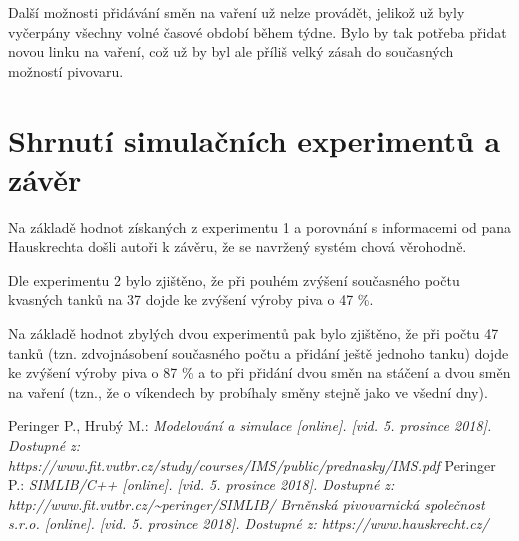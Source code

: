 \documentclass[11pt,a4paper]{article}
\begin{document}
Další možnosti přidávání směn na vaření už nelze provádět, jelikož už byly vyčerpány všechny volné časové období během týdne. Bylo by tak potřeba přidat novou linku na vaření, což už by byl ale příliš velký zásah do současných možností pivovaru.
   
\section{Shrnutí simulačních experimentů a závěr}
Na základě hodnot získaných z experimentu 1 a porovnání s informacemi od pana Hauskrechta došli autoři k závěru, že se navržený systém chová věrohodně.

Dle experimentu 2 bylo zjištěno, že při pouhém zvýšení současného počtu kvasných tanků na 37 dojde ke zvýšení výroby piva o 47 \%.

Na základě hodnot zbylých dvou experimentů pak bylo zjištěno, že při počtu 47 tanků (tzn. zdvojnásobení současného počtu a přidání ještě jednoho tanku) dojde ke zvýšení výroby piva o 87 \% a to při přidání dvou směn na stáčení a dvou směn na vaření (tzn., že o víkendech by probíhaly směny stejně jako ve všední dny).


   
\newpage
\begin{thebibliography}{Per00}
	 Peringer P., Hrubý M.:
    \emph{Modelování a simulace [online]. [vid. 5. prosince 2018]. Dostupné z: https://www.fit.vutbr.cz/study/courses/IMS/public/prednasky/IMS.pdf }
	 Peringer P.:
    \emph{SIMLIB/C++ [online]. [vid. 5. prosince 2018]. Dostupné z: http://www.fit.vutbr.cz/\~{}peringer/SIMLIB/ }
	 \emph{Brněnská pivovarnická společnost s.r.o. [online]. [vid. 5. prosince 2018]. Dostupné z: https://www.hauskrecht.cz/ }
\end{thebibliography}
	
\end{document}
